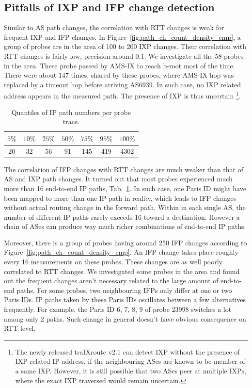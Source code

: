 \subsection{Pitfalls of IXP and IFP change detection}
Similar to AS path changes, the correlation with RTT changes is weak for frequent IXP and IFP changes.
In Figure~\ref{fig:path_ch_count_density_cmp}, a group of probes are in the area of 100 to 200 IXP changes. Their correlation with RTT changes is fairly low, precision  around $0.1$.
We investigate all the 58 probes in the area. These probe passed by AMS-IX to reach b-root most of the time. There were about 147 times, shared by these probes, where AMS-IX hop was replaced by a timeout hop before arriving AS6939.
In such case, no IXP related address appears in the measured path. The presence of IXP is thus uncertain \footnote{The newly released traIXroute v2.1 can detect IXP without the presence of IXP related IP address, if the neighbouring ASes are known to be member of a same IXP. However, it is still possible that two ASes peer at multiple IXPs, where the exact IXP traversed would remain uncertain.}.

\begin{table}[!htb]
\caption{Quantiles of IP path numbers per probe trace.}
\label{tab:ip_path_count}
\centering
\footnotesize
\setlength{\tabcolsep}{0.5em}
\begin{tabular}{ccccccc}
\toprule
$5\%$ & $10\%$ & $25\%$ & $50\%$ & $75\%$ & $95\%$ & $100\%$\\
\midrule
20 & 32 & 56 & 91 & 145 & 419 & 4302\\
\bottomrule
\end{tabular}
\end{table}

The correlation of IFP changes with RTT changes are much weaker than that of AS and IXP path changes.
It turned out that most probes experienced much more than 16 end-to-end IP paths, Tab.~\ref{tab:ip_path_count}.
In such case, one Paris ID might have been mapped to more than one IP path in reality, which leads to IFP changes without actual routing change in the forward path.
Within in each single AS, the number of different IP paths rarely exceeds 16 toward a destination. However a chain of ASes can produce way much richer combinations of end-to-end IP paths.

Moreover, there is a group of probes having around 250 IFP changes according to Figure~\ref{fig:path_ch_count_density_cmp}.
An IFP change takes place roughly every 16 measurements on these probes. 
These changes are as well poorly correlated to RTT changes.
We investigated some probes in the area and found out the frequent changes aren't necessary related to the large amount of end-to-end paths.
For some probes, two neighbouring IFPs only differ at one or two Paris IDs.
IP paths taken by these Paris IDs oscillates between a few alternatives frequently.
For example, the Paris ID 6, 7, 8, 9 of probe 23998 switches a lot among only 2 paths.
Such change in general doesn't have obvious consequence on RTT level.

